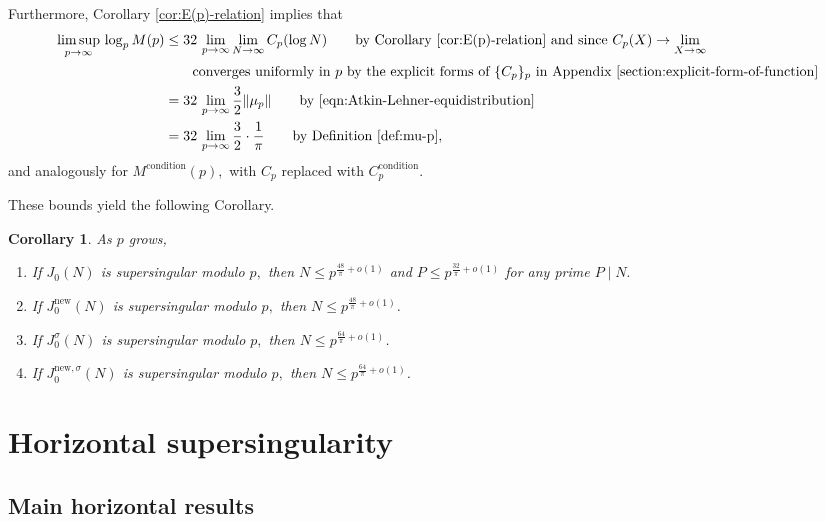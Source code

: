 \documentclass[11pt,letterpaper,reqno]{amsart}
\newtheorem{corollary}[theorem]{Corollary}
\theoremstyle{definition}
\numberwithin{equation}{section}
\numberwithin{figure}{section}
\numberwithin{table}{section}
\let\subsectiontemp\subsection
\renewcommand{\subsection}[1]{ 
    \subsectiontemp{#1} \hfill\vspace{0.5\linespacing} 
}
\newcommand{\nw}{\mathrm{new}}
\begin{document}
Furthermore, Corollary \ref{cor:E(p)-relation} implies that
\begin{align}
    \limsup_{p \rightarrow \infty} \, \log_pM(p) &\leq 32 \, \lim_{p \rightarrow \infty} \lim_{N \rightarrow \infty} C_p(\log N) \qquad \text{by Corollary \ref{cor:E(p)-relation} and since $C_p(X) \rightarrow \lim_{X \rightarrow \infty}$}\\
    &\qquad \text{converges uniformly in $p$ by the explicit forms of $\{C_p\}_p$ in Appendix \ref{section:explicit-form-of-function}}\\
    &= 32 \, \lim_{p \rightarrow \infty} \frac{3}{2} \| \mu_p \| \qquad \text{by \eqref{eqn:Atkin-Lehner-equidistribution}}\\
    &= 32 \, \lim_{p \rightarrow \infty} \frac{3}{2} \cdot \frac{1}{\pi} \qquad \text{by Definition \ref{def:mu-p}},
\end{align}
and analogously for $M^{\text{condition}}(p),$ with $C_p$ replaced with $C_p^{\text{condition}}$. 


These bounds yield the following Corollary.
\begin{corollary} \label{cor:vertical-suprsingularity-with explicit exponent}
    As $p$ grows, 
    \begin{enumerate}
        \item If $J_0(N)$ is supersingular modulo $p,$ then $N \leq p^{\frac{48}{\pi} + o(1)}$ and $P \leq p^{\frac{32}{\pi} + o(1)}$ for any prime $P \mid N.$
        \item If $J_0^\nw(N)$ is supersingular modulo $p,$ then $N \leq p^{\frac{48}{\pi} + o(1)}$.
    \item If $J_0^\sigma(N)$ is supersingular modulo $p,$ then $N \leq p^{\frac{64}{\pi} + o(1)}$. 
    \item If $J_0^{\nw,\sigma}(N)$ is supersingular modulo $p,$ then $N \leq p^{\frac{64}{\pi} + o(1)}$.
    \end{enumerate}
\end{corollary}





\section{Horizontal supersingularity}\label{section:horizontal}

\subsection{Main horizontal results}
\end{document}

